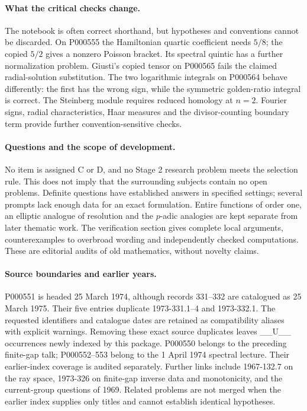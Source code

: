 \paragraph{What the critical checks change.}
The notebook is often correct shorthand, but hypotheses and conventions cannot
be discarded. On P000555 the Hamiltonian quartic coefficient needs \(5/8\);
the copied \(5/2\) gives a nonzero Poisson bracket. Its spectral quintic has
a further normalization problem. Giusti's copied tensor on P000565 fails
the claimed radial-solution substitution. The two logarithmic integrals on
P000564 behave differently: the first has the wrong sign, while the symmetric
golden-ratio integral is correct. The Steinberg module requires reduced
homology at \(n=2\). Fourier signs, radial characteristics, Haar measures and
the divisor-counting boundary term provide further convention-sensitive checks.

\paragraph{Questions and the scope of development.}
No item is assigned C or D, and no Stage 2 research problem meets the selection
rule. This does not imply that the surrounding subjects contain no open problems.
Definite questions have established answers in specified settings; several
prompts lack enough data for an exact formulation. Entire functions of order
one, an elliptic analogue of resolution and the \(p\)-adic analogies are kept
separate from later thematic work. The verification section gives complete
local arguments, counterexamples to overbroad wording and independently checked
computations. These are editorial audits of old mathematics, without novelty claims.

\paragraph{Source boundaries and earlier years.}
P000551 is headed 25 March 1974, although records 331--332 are catalogued as
25 March 1975. Their five entries duplicate 1973-331.1--4 and 1973-332.1.
The requested identifiers and catalogue dates are retained as compatibility
aliases with explicit warnings. Removing these exact source duplicates leaves
__U__ occurrences newly indexed by this package. P000550 belongs to the preceding
finite-gap talk; P000552--553 belong to the 1 April 1974 spectral lecture.
Their earlier-index coverage is audited separately. Further links include
1967-132.7 on the ray space, 1973-326 on finite-gap inverse data and monotonicity,
and the current-group questions of 1969. Related problems are not merged when
the earlier index supplies only titles and cannot establish identical hypotheses.
